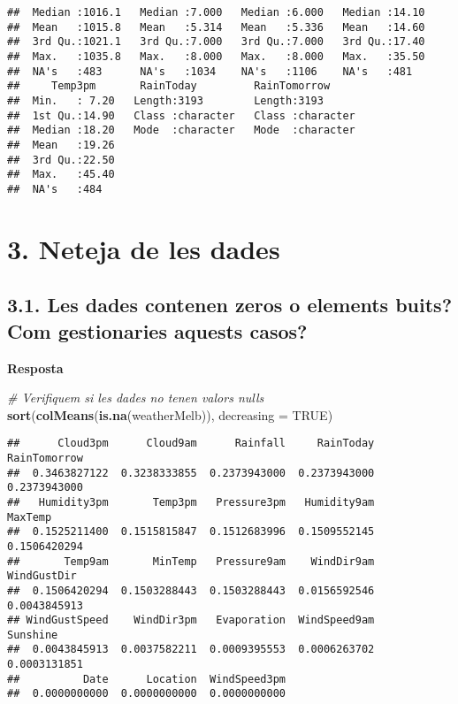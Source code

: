\documentclass[
]{article}
\newenvironment{Shaded}{\begin{snugshade}}{\end{snugshade}}
\newcommand{\CommentTok}[1]{\textcolor[rgb]{0.56,0.35,0.01}{\textit{#1}}}
\newcommand{\DataTypeTok}[1]{\textcolor[rgb]{0.13,0.29,0.53}{#1}}
\newcommand{\KeywordTok}[1]{\textcolor[rgb]{0.13,0.29,0.53}{\textbf{#1}}}
\newcommand{\NormalTok}[1]{#1}
\newcommand{\OtherTok}[1]{\textcolor[rgb]{0.56,0.35,0.01}{#1}}
\begin{document}
\begin{verbatim}
##  Median :1016.1   Median :7.000   Median :6.000   Median :14.10  
##  Mean   :1015.8   Mean   :5.314   Mean   :5.336   Mean   :14.60  
##  3rd Qu.:1021.1   3rd Qu.:7.000   3rd Qu.:7.000   3rd Qu.:17.40  
##  Max.   :1035.8   Max.   :8.000   Max.   :8.000   Max.   :35.50  
##  NA's   :483      NA's   :1034    NA's   :1106    NA's   :481    
##     Temp3pm       RainToday         RainTomorrow      
##  Min.   : 7.20   Length:3193        Length:3193       
##  1st Qu.:14.90   Class :character   Class :character  
##  Median :18.20   Mode  :character   Mode  :character  
##  Mean   :19.26                                        
##  3rd Qu.:22.50                                        
##  Max.   :45.40                                        
##  NA's   :484
\end{verbatim}

\hypertarget{neteja-de-les-dades}{%
\section{3. Neteja de les dades}\label{neteja-de-les-dades}}

\hypertarget{les-dades-contenen-zeros-o-elements-buits-com-gestionaries-aquests-casos}{%
\subsection{3.1. Les dades contenen zeros o elements buits? Com
gestionaries aquests
casos?}\label{les-dades-contenen-zeros-o-elements-buits-com-gestionaries-aquests-casos}}

\textbf{Resposta}

\begin{Shaded}
\begin{Highlighting}[]
\CommentTok{# Verifiquem si les dades no tenen valors nulls}
\KeywordTok{sort}\NormalTok{(}\KeywordTok{colMeans}\NormalTok{(}\KeywordTok{is.na}\NormalTok{(weatherMelb)), }\DataTypeTok{decreasing =} \OtherTok{TRUE}\NormalTok{)}
\end{Highlighting}
\end{Shaded}

\begin{verbatim}
##      Cloud3pm      Cloud9am      Rainfall     RainToday  RainTomorrow 
##  0.3463827122  0.3238333855  0.2373943000  0.2373943000  0.2373943000 
##   Humidity3pm       Temp3pm   Pressure3pm   Humidity9am       MaxTemp 
##  0.1525211400  0.1515815847  0.1512683996  0.1509552145  0.1506420294 
##       Temp9am       MinTemp   Pressure9am    WindDir9am   WindGustDir 
##  0.1506420294  0.1503288443  0.1503288443  0.0156592546  0.0043845913 
## WindGustSpeed    WindDir3pm   Evaporation  WindSpeed9am      Sunshine 
##  0.0043845913  0.0037582211  0.0009395553  0.0006263702  0.0003131851 
##          Date      Location  WindSpeed3pm 
##  0.0000000000  0.0000000000  0.0000000000
\end{verbatim}
\end{document}

